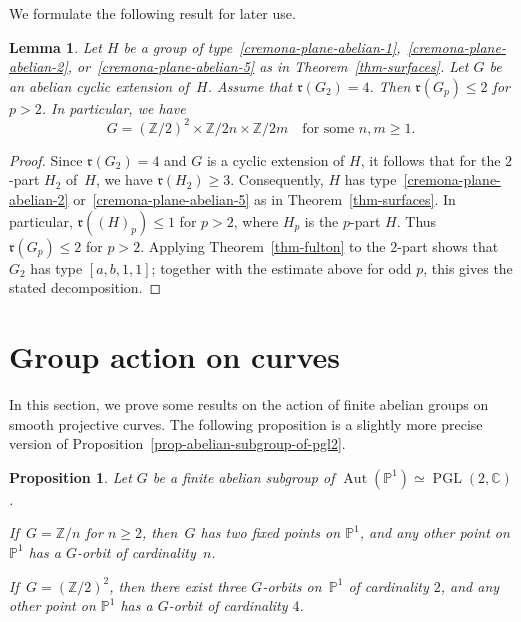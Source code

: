 \documentclass[11pt]{amsart}
\numberwithin{equation}{section}
\newtheorem{proposition}[thm]{Proposition}
\newtheorem{lem}[thm]{Lemma}
\theoremstyle{definition}
\theoremstyle{remark}
\DeclareMathOperator{\Aut}{Aut}
\DeclareMathOperator{\PGL}{PGL}
\begin{document}
We formulate the following result for later use.

\begin{lem}
\label{cor-r2-4-rp-2}
Let $H$ be a group of type~\eqref{cremona-plane-abelian-1},~\eqref{cremona-plane-abelian-2}, or~\eqref{cremona-plane-abelian-5} as in Theorem~\ref{thm-surfaces}.  Let $G$ be an abelian cyclic extension of\, $H$. Assume that $\mathfrak{r}(G_2)= 4$. Then $\mathfrak{r}(G_p)\leq 2$ for $p>2$. In particular, we have
\[
G=(\mathbb{Z}/2)^2\times\mathbb{Z}/2n\times\mathbb{Z}/2m \quad  \text{for some } n,m\geq 1.
\] 
\end{lem}

\begin{proof}
Since $\mathfrak{r}(G_2)=4$ and $G$ is a cyclic extension of $H$, it follows that for the $2$-part $H_2$ of~$H$, we have $\mathfrak{r}(H_2)\geq 3$. Consequently, $H$ has type~\eqref{cremona-plane-abelian-2} or~\eqref{cremona-plane-abelian-5} as in Theorem~\ref{thm-surfaces}. In particular, $\mathfrak{r}((H)_p) \leq 1$ for $p>2$, where $H_p$ is the $p$-part $H$. Thus $\mathfrak{r}(G_p)\leq 2$ for $p>2$. Applying Theorem~\ref{thm-fulton} to the $2$-part shows that $G_2$ has type $[a,b,1,1]$; together with the estimate above for odd $p$, this gives the stated decomposition.
\end{proof}

\section{Group action on curves}
\label{sec-group-action-on-curves}
In this section, we prove some results on the action of finite abelian groups on smooth projective curves.  The following proposition is a slightly more precise version of Proposition~\ref{prop-abelian-subgroup-of-pgl2}.

\begin{proposition}
\label{prop-rational-curve}
Let $G$ be a finite abelian subgroup of $\Aut(\mathbb{P}^1)\simeq\PGL(2, \mathbb{C})$.

If\, $G=\mathbb{Z}/n$ for $n\geq 2$, then~$G$ has two fixed points on $\mathbb{P}^1$, and any other point on $\mathbb{P}^1$ has a $G$-orbit of cardinality~$n$. 

If\, $G=(\mathbb{Z}/2)^2$, then there exist three $G$-orbits on~$\mathbb{P}^1$ of cardinality $2$, and any other point on $\mathbb{P}^1$ has a $G$-orbit of cardinality $4$. 
\end{proposition}
\end{document}

